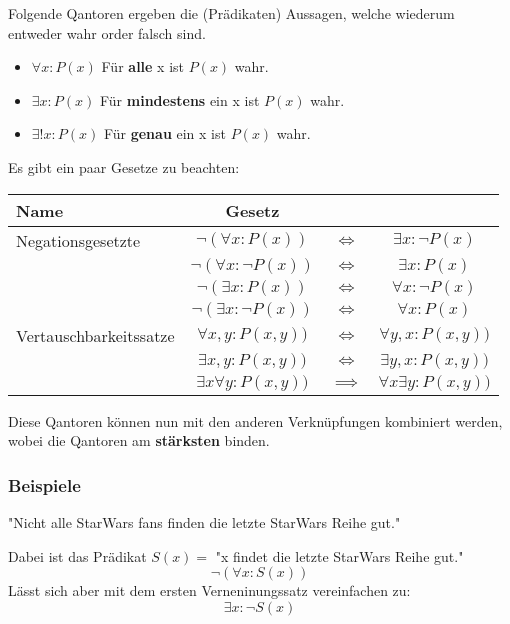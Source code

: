 \documentclass[a4paper,12pt]{article}
\begin{document}
Folgende Qantoren ergeben die (Prädikaten) Aussagen, welche wiederum entweder wahr order falsch sind.
\begin{itemize}
  \item $\forall x : P(x)$ Für \textbf{alle} x ist $P(x)$ wahr.
  \item $\exists x : P(x)$ Für \textbf{mindestens} ein x ist $P(x)$ wahr.
  \item $\exists! x : P(x)$ Für \textbf{genau} ein x ist $P(x)$ wahr.
\end{itemize}

Es gibt ein paar Gesetze zu beachten:

\begin{tabular}{l|ccc}
  \textbf{Name} & \textbf{Gesetz} \\
  \hline
  Negationsgesetzte & \(\neg ( \forall x : P(x)) \) & $\iff$ & $\exists x : \neg P(x) $\\
   & \(\neg ( \forall x : \neg P(x))\) & $ \iff $ & $\exists x :  P(x)$  \\
   & \(\neg ( \exists x :  P(x))\) & $\iff$ & \(\forall x : \neg P(x)\)  \\   
   & \(\neg ( \exists x : \neg P(x))\) & $ \iff $ & \(\forall x :  P(x)\)  \\
  \hline
  Vertauschbarkeitssatze & \( \forall x,y : P(x, y)) \) & $\iff$ & $\forall y,x : P(x, y)) $\\
   & \( \exists x,y : P(x, y)) \) & $\iff$ & $\exists y,x : P(x, y)) $\\
   & \( \exists x \forall y : P(x, y)) \) & $\implies$ & $\forall x \exists y : P(x, y))  $\\  
  \end{tabular}

Diese Qantoren können nun mit den anderen Verknüpfungen kombiniert werden, wobei die Qantoren am \textbf{stärksten} binden.
\subsubsection{Beispiele}
"Nicht alle StarWars fans finden die letzte StarWars Reihe gut."

Dabei ist das Prädikat $S(x) = $ "x findet die letzte StarWars Reihe gut."
\begin{displaymath}
  \neg (\forall x : S(x))
\end{displaymath}
Lässt sich aber mit dem ersten Verneninungssatz vereinfachen zu:
\begin{displaymath}
  \exists x : \neg S(x)
\end{displaymath}
\end{document}
